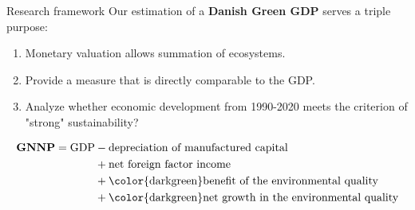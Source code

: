 \begin{frame}{Research framework}
  Our estimation of a \textbf{Danish Green GDP} serves a triple purpose:
  \pause
  \begin{enumerate}
    \item Monetary valuation allows summation of ecosystems.
    \pause
    \item Provide a measure that is directly comparable to the GDP.
    \pause
    \item Analyze whether economic development from 1990-2020 meets the criterion of "strong" sustainability?
  \end{enumerate}
  \pause
  \begin{tcolorbox}
    \begin{align*}
        \textbf{GNNP} = \text{GDP} &- \text{depreciation of manufactured capital} \\
        &+ \text{net foreign factor income} \\
        &+ \text{\color{darkgreen}benefit of the environmental quality} \\
        &+ \text{\color{darkgreen}net growth in the environmental quality}
    \end{align*}
  \end{tcolorbox}
  \vfill


\end{frame}
